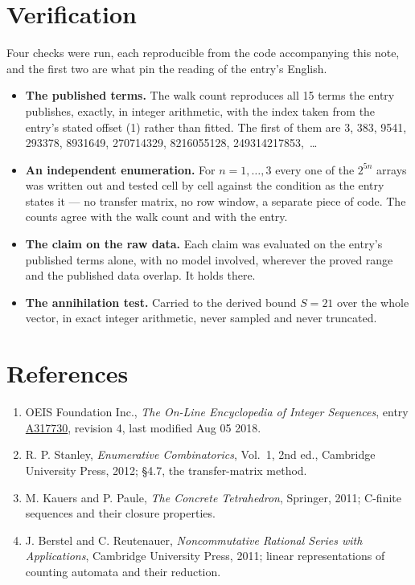 \documentclass[11pt]{article}
\theoremstyle{definition}
\begin{document}
\section{Verification}

Four checks were run, each reproducible from the code accompanying this note, and the first two are what pin the reading of the entry's English.

\begin{itemize}

\item {\bfseries The published terms.} The walk count reproduces all 15 terms the entry publishes, exactly, in integer arithmetic, with the index taken from the entry's stated offset (1) rather than fitted. The first of them are 3, 383, 9541, 293378, 8931649, 270714329, 8216055128, 249314217853,~\dots

\item {\bfseries An independent enumeration.} For $n = 1,\dots,3$ every one of the $2^{5n}$ arrays was written out and tested cell by cell against the condition as the entry states it --- no transfer matrix, no row window, a separate piece of code. The counts agree with the walk count and with the entry.

\item {\bfseries The claim on the raw data.} Each claim was evaluated on the entry's published terms alone, with no model involved, wherever the proved range and the published data overlap. It holds there.

\item {\bfseries The annihilation test.} Carried to the derived bound $S = 21$ over the whole vector, in exact integer arithmetic, never sampled and never truncated.

\end{itemize}

\section{References}

\begin{enumerate}

\item OEIS Foundation Inc., \emph{The On-Line Encyclopedia of Integer Sequences}, entry \href{https://oeis.org/A317730}{A317730}, revision 4, last modified Aug 05 2018.

\item R. P. Stanley, \emph{Enumerative Combinatorics}, Vol.~1, 2nd ed., Cambridge University Press, 2012; \S4.7, the transfer-matrix method.

\item M. Kauers and P. Paule, \emph{The Concrete Tetrahedron}, Springer, 2011; C-finite sequences and their closure properties.

\item J. Berstel and C. Reutenauer, \emph{Noncommutative Rational Series with Applications}, Cambridge University Press, 2011; linear representations of counting automata and their reduction.

\end{enumerate}
\end{document}
